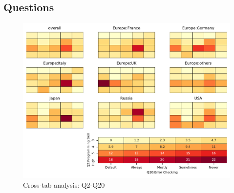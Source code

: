 
\subsection{Questions}


\begin{figure}
\begin{center}
\includegraphics[width=12cm]{../pdfs/Q2-Q20.pdf}
\caption{Cross-tab analysis: Q2-Q20}
\label{fig:Q2-Q20}
\end{center}
\end{figure}
